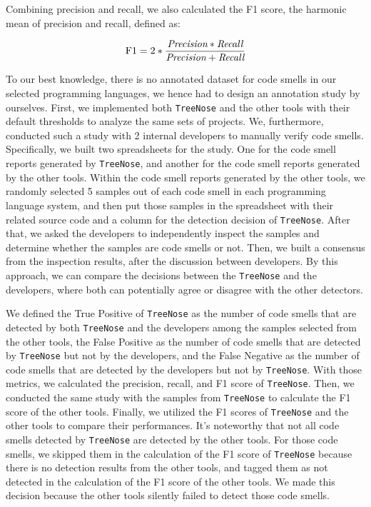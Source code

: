 Combining precision and recall, we also calculated the F1 score, the harmonic
mean of precision and recall, defined as:

\vspace{-0.5em}

\begin{equation}
    \textnormal{F1} = 2 * \frac{\textit{Precision} * \textit{Recall}}{\textit{Precision} + \textit{Recall}}
\end{equation}



To our best knowledge, there is no annotated dataset for code smells in our
selected programming languages, we hence had to design an annotation study by
ourselves. First, we implemented both \texttt{TreeNose} and the other tools
with their default thresholds to analyze the same sets of projects. We,
furthermore, conducted such a study with 2 internal developers to manually
verify code smells. Specifically, we built two spreadsheets for the study. One
for the code smell reports generated by \texttt{TreeNose}, and another for the
code smell reports generated by the other tools. Within the code smell reports
generated by the other tools, we randomly selected 5 samples out of each code
smell in each programming language system, and then put those samples in the
spreadsheet with their related source code and a column for the detection
decision of \texttt{TreeNose}. After that, we asked the developers to
independently inspect the samples and determine whether the samples are code
smells or not. Then, we built a consensus from the inspection results, after
the discussion between developers. By this approach, we can compare the
decisions between the \texttt{TreeNose} and the developers, where both can
potentially agree or disagree with the other detectors.

We defined the True Positive of \texttt{TreeNose} as the number of code smells
that are detected by both \texttt{TreeNose} and the developers among the
samples selected from the other tools, the False Positive as the number of code
smells that are detected by \texttt{TreeNose} but not by the developers, and
the False Negative as the number of code smells that are detected by the
developers but not by \texttt{TreeNose}. With those metrics, we calculated the
precision, recall, and F1 score of \texttt{TreeNose}. Then, we conducted the
same study with the samples from \texttt{TreeNose} to calculate the F1 score of
the other tools. Finally, we utilized the F1 scores of \texttt{TreeNose} and
the other tools to compare their performances. It's noteworthy that not all
code smells detected by \texttt{TreeNose} are detected by the other tools. For
those code smells, we skipped them in the calculation of the F1 score of
\texttt{TreeNose} because there is no detection results from the other tools,
and tagged them as not detected in the calculation of the F1 score of the other
tools. We made this decision because the other tools silently failed to detect
those code smells.

